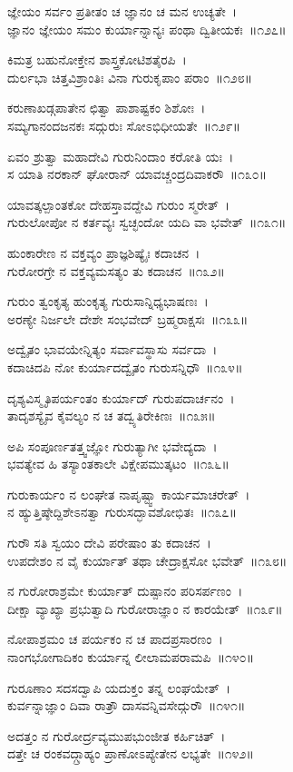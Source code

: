 ಜ್ಞೇಯಂ ಸರ್ವಂ ಪ್ರತೀತಂ ಚ ಜ್ಞಾನಂ ಚ ಮನ ಉಚ್ಯತೇ~।\\
ಜ್ಞಾನಂ ಜ್ಞೇಯಂ ಸಮಂ ಕುರ್ಯಾನ್ನಾನ್ಯಃ ಪಂಥಾ ದ್ವಿತೀಯಕಃ~॥೧೨೭॥

ಕಿಮತ್ರ ಬಹುನೋಕ್ತೇನ ಶಾಸ್ತ್ರಕೋಟಿಶತೈರಪಿ~।\\
ದುರ್ಲಭಾ ಚಿತ್ತವಿಶ್ರಾಂತಿಃ ವಿನಾ ಗುರುಕೃಪಾಂ ಪರಾಂ~॥೧೨೮॥

ಕರುಣಾಖಡ್ಗಪಾತೇನ ಛಿತ್ವಾ ಪಾಶಾಷ್ಟಕಂ ಶಿಶೋಃ~।\\
ಸಮ್ಯಗಾನಂದಜನಕಃ ಸದ್ಗುರುಃ ಸೋಽಭಿಧೀಯತೇ~॥೧೨೯॥

ಏವಂ ಶ್ರುತ್ವಾ ಮಹಾದೇವಿ ಗುರುನಿಂದಾಂ ಕರೋತಿ ಯಃ~।\\
ಸ ಯಾತಿ ನರಕಾನ್ ಘೋರಾನ್ ಯಾವಚ್ಚಂದ್ರದಿವಾಕರೌ~॥೧೩೦॥

ಯಾವತ್ಕಲ್ಪಾಂತಕೋ ದೇಹಸ್ತಾವದ್ದೇವಿ ಗುರುಂ ಸ್ಮರೇತ್~।\\
ಗುರುಲೋಪೋ ನ ಕರ್ತವ್ಯಃ ಸ್ವಚ್ಛಂದೋ ಯದಿ ವಾ ಭವೇತ್~॥೧೩೧॥

ಹುಂಕಾರೇಣ ನ ವಕ್ತವ್ಯಂ ಪ್ರಾಜ್ಞಶಿಷ್ಯೈಃ ಕದಾಚನ~।\\
ಗುರೋರಗ್ರೇ ನ ವಕ್ತವ್ಯಮಸತ್ಯಂ ತು ಕದಾಚನ~॥೧೩೨॥

ಗುರುಂ ತ್ವಂಕೃತ್ಯ ಹುಂಕೃತ್ಯ ಗುರುಸಾನ್ನಿಧ್ಯಭಾಷಣಃ~।\\
ಅರಣ್ಯೇ ನಿರ್ಜಲೇ ದೇಶೇ ಸಂಭವೇದ್ ಬ್ರಹ್ಮರಾಕ್ಷಸಃ~॥೧೩೩॥

ಅದ್ವೈತಂ ಭಾವಯೇನ್ನಿತ್ಯಂ ಸರ್ವಾವಸ್ಥಾಸು ಸರ್ವದಾ~।\\
ಕದಾಚಿದಪಿ ನೋ ಕುರ್ಯಾದದ್ವೈತಂ ಗುರುಸನ್ನಿಧೌ~॥೧೩೪॥

ದೃಶ್ಯವಿಸ್ಮೃತಿಪರ್ಯಂತಂ ಕುರ್ಯಾದ್ ಗುರುಪದಾರ್ಚನಂ~।\\
ತಾದೃಶಸ್ಯೈವ ಕೈವಲ್ಯಂ ನ ಚ ತದ್ವ್ಯತಿರೇಕಿಣಃ~॥೧೩೫॥

ಅಪಿ ಸಂಪೂರ್ಣತತ್ತ್ವಜ್ಞೋ ಗುರುತ್ಯಾಗೀ ಭವೇದ್ಯದಾ~।\\
ಭವತ್ಯೇವ ಹಿ ತಸ್ಯಾಂತಕಾಲೇ ವಿಕ್ಷೇಪಮುತ್ಕಟಂ~॥೧೩೬॥

ಗುರುಕಾರ್ಯಂ ನ ಲಂಘೇತ ನಾಪೃಷ್ಟ್ವಾ ಕಾರ್ಯಮಾಚರೇತ್~।\\
ನ ಹ್ಯುತ್ತಿಷ್ಠೇದ್ದಿಶೇಽನತ್ವಾ ಗುರುಸದ್ಭಾವಶೋಭಿತಃ~॥೧೩೭॥

ಗುರೌ ಸತಿ ಸ್ವಯಂ ದೇವಿ ಪರೇಷಾಂ ತು ಕದಾಚನ~।\\
ಉಪದೇಶಂ ನ ವೈ ಕುರ್ಯಾತ್ ತಥಾ ಚೇದ್ರಾಕ್ಷಸೋ ಭವೇತ್~॥೧೩೮॥

ನ ಗುರೋರಾಶ್ರಮೇ ಕುರ್ಯಾತ್ ದುಷ್ಪಾನಂ ಪರಿಸರ್ಪಣಂ~।\\
ದೀಕ್ಷಾ ವ್ಯಾಖ್ಯಾ ಪ್ರಭುತ್ವಾದಿ ಗುರೋರಾಜ್ಞಾಂ ನ ಕಾರಯೇತ್~॥೧೩೯॥

ನೋಪಾಶ್ರಮಂ ಚ ಪರ್ಯಕಂ ನ ಚ ಪಾದಪ್ರಸಾರಣಂ~।\\
ನಾಂಗಭೋಗಾದಿಕಂ ಕುರ್ಯಾನ್ನ ಲೀಲಾಮಪರಾಮಪಿ~॥೧೪೦॥

ಗುರೂಣಾಂ ಸದಸದ್ವಾಪಿ ಯದುಕ್ತಂ ತನ್ನ ಲಂಘಯೇತ್~।\\
ಕುರ್ವನ್ನಾಜ್ಞಾಂ ದಿವಾ ರಾತ್ರೌ ದಾಸವನ್ನಿವಸೇದ್ಗುರೌ~॥೧೪೧॥

ಅದತ್ತಂ ನ ಗುರೋರ್ದ್ರವ್ಯಮುಪಭುಂಜೀತ ಕರ್ಹಿಚಿತ್~।\\
ದತ್ತೇ ಚ ರಂಕವದ್ಗ್ರಾಹ್ಯಂ ಪ್ರಾಣೋಽಪ್ಯೇತೇನ ಲಭ್ಯತೇ~॥೧೪೨॥

